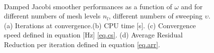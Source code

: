    \begin{figure}[hbt!]
   \centering
        \\
        \caption{Damped Jacobi smoother performances as a function of $\omega$ and for different numbers of mesh levels $n_l$, different numbers of sweeping $\upsilon$. (a) Iterations at convergence.(b) CPU time [s]. (c) Convergence speed defined in equation [Hz] \ref{eq.cs}. (d) Average Residual Reduction per iteration defined in equation \ref{eq.arr}. }
        \label{f.1.32}
      \end{figure} 
